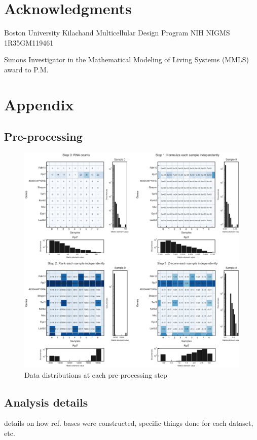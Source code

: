 \documentclass[aps,superscriptaddress, notitlepage,longbibliography]{revtex4-1}
\newcommand{\beginsupplement}{%
        \setcounter{table}{0}
        \renewcommand{\thetable}{S\arabic{table}}%
        \setcounter{figure}{0}
        \renewcommand{\thefigure}{S\arabic{figure}}%
     }
\begin{document}
\section*{Acknowledgments}

Boston University Kilachand Multicellular Design Program NIH NIGMS 1R35GM119461

Simons Investigator in the Mathematical Modeling of Living Systems (MMLS) award to P.M.

\section*{Appendix}
\beginsupplement
\subsection{Pre-processing} \label{preprocessing}

\begin{figure}
	\centering
		\includegraphics[scale=0.6]{figs/fig1a supplement.pdf}
	\caption{Data distributions at each pre-processing step}
	\label{FIG:supp1}
\end{figure}

\subsection{Analysis details \label{analysis}}
details on how ref. bases were constructed, specific things done for each dataset, etc.
\end{document}
